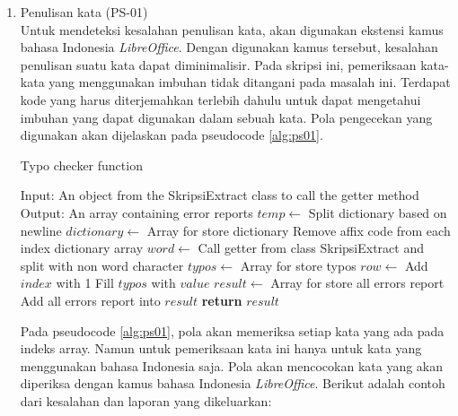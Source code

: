 \begin{enumerate}
	\item Penulisan kata (PS-01) \\
	Untuk mendeteksi kesalahan penulisan kata, akan digunakan ekstensi kamus bahasa Indonesia \textit{LibreOffice}. Dengan digunakan kamus tersebut, kesalahan penulisan suatu kata dapat diminimalisir. Pada skripsi ini, pemeriksaan kata-kata yang menggunakan imbuhan tidak ditangani pada masalah ini. Terdapat kode yang harus diterjemahkan terlebih dahulu untuk dapat mengetahui imbuhan yang dapat digunakan dalam sebuah kata. Pola pengecekan yang digunakan akan dijelaskan pada pseudocode \ref{alg:ps01}.
		
\begin{minipage}{1.0\linewidth}
\begin{algorithm}[H]
    \caption{Typo checker function}
	\label{alg:ps01}
	\begin{algorithmic}[1]
    		\State Input: An object from the SkripsiExtract class to call the getter method
			\State Output: An array containing error reports		
			\State $temp \gets$ Split dictionary based on newline
			\State $dictionary \gets$ Array for store dictionary
				\State Remove affix code from each index dictionary array 
			\EndFor
			\State $word \gets$ Call getter from class SkripsiExtract and split with non word character
			\State $typos \gets$ Array for store typos
    			\State $row \gets$ Add $index$ with 1
                	\State Fill $typos$ with $value$
            	\EndIf
        	\EndFor
			\State $result \gets$ Array for store all errors report
                \State Add all errors report into $result$
            \EndIf
    		\State \textbf{return} $result$
    	\EndFunction
	\end{algorithmic}
\end{algorithm}
\end{minipage}
\medskip

	Pada pseudocode \ref{alg:ps01}, pola akan memeriksa setiap kata yang ada pada indeks array. Namun untuk pemeriksaan kata ini hanya untuk kata yang menggunakan bahasa Indonesia saja. Pola akan mencocokan kata yang akan diperiksa dengan kamus bahasa Indonesia \textit{LibreOffice}. Berikut adalah contoh dari kesalahan dan laporan yang dikeluarkan:
	

\end{enumerate}
